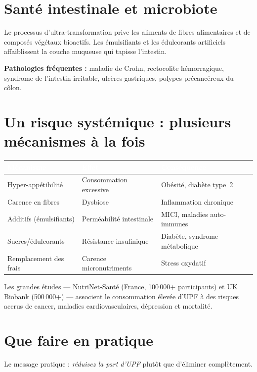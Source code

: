 \documentclass[a5paper,12pt,oneside,openany]{book}
\begin{document}
\section{Santé intestinale et microbiote}

Le processus d'ultra-transformation prive les aliments de fibres alimentaires
et de composés végétaux bioactifs. Les émulsifiants et les édulcorants
artificiels affaiblissent la couche muqueuse qui tapisse l'intestin.

\textbf{Pathologies fréquentes :} maladie de Crohn, rectocolite hémorragique,
syndrome de l'intestin irritable, ulcères gastriques, polypes précancéreux
du côlon.

\section{Un risque systémique : plusieurs mécanismes à la fois}

{\small
\begin{tabularx}{\textwidth}{|l|L|L|}
\hline
{}
  \textcolor{white}{\textbf{Mécanisme}}
  & \textcolor{white}{\textbf{Effet}}
  & \textcolor{white}{\textbf{Conséquence}} \\
\hline
Hyper-appétibilité & Consommation excessive & Obésité, diabète type~2 \\
\hline
Carence en fibres & Dysbiose & Inflammation chronique \\
\hline
Additifs (émulsifiants) & Perméabilité intestinale & MICI, maladies auto-immunes \\
\hline
Sucres/édulcorants & Résistance insulinique & Diabète, syndrome métabolique \\
\hline
Remplacement des frais & Carence micronutriments & Stress oxydatif \\
\hline
\end{tabularx}
}

Les grandes études --- NutriNet-Santé (France, 100\,000+ participants) et
UK Biobank (500\,000+) --- associent le consommation élevée d'UPF à des
risques accrus de cancer, maladies cardiovasculaires, dépression et mortalité.

\section{Que faire en pratique}

Le message pratique : \emph{réduisez la part d'UPF} plutôt que d'éliminer
complètement.
\end{document}
